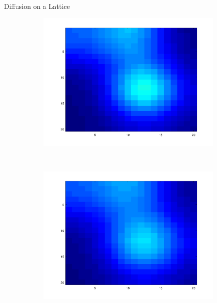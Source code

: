 \documentclass{beamer}
\begin{document}
\begin{frame}{Diffusion on a Lattice}
\begin{figure}[!h]
\begin{subfigure}[b]{0.25\textwidth}
    	\includegraphics[width=\textwidth]{images/anim_200.png}
    \end{subfigure}~
    \begin{subfigure}[b]{0.25\textwidth}
    	\includegraphics[width= \textwidth]{images/anim_240.png}
    \end{subfigure}~
    \begin{subfigure}[b]{0.25\textwidth}

\end{subfigure}
\end{figure}
\end{frame}
\end{document}
